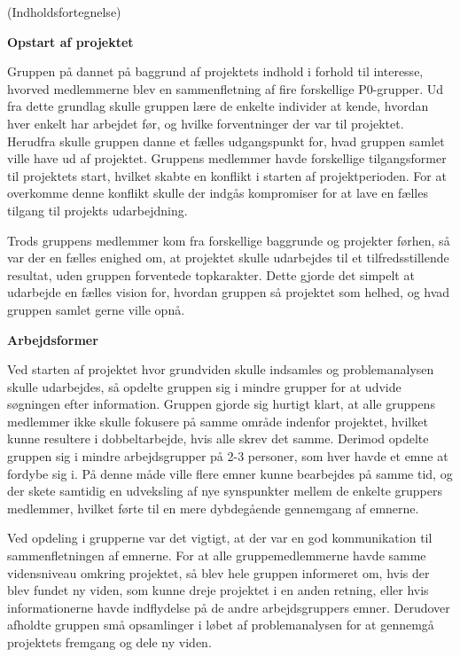 (Indholdsfortegnelse)

\newpage

\textbf{Opstart af projektet}

Gruppen på dannet på baggrund af projektets indhold i forhold til interesse, hvorved medlemmerne blev en sammenfletning af fire forskellige P0-grupper. Ud fra dette grundlag skulle gruppen lære de enkelte individer at kende, hvordan hver enkelt har arbejdet før, og hvilke forventninger der var til projektet. Herudfra skulle gruppen danne et fælles udgangspunkt for, hvad gruppen samlet ville have ud af projektet. Gruppens medlemmer havde forskellige tilgangsformer til projektets start, hvilket skabte en konflikt i starten af projektperioden. For at overkomme denne konflikt skulle der indgås kompromiser for at lave en fælles tilgang til projekts udarbejdning.

Trods gruppens medlemmer kom fra forskellige baggrunde og projekter førhen, så var der en fælles enighed om, at projektet skulle udarbejdes til et tilfredsstillende resultat, uden gruppen forventede topkarakter. Dette gjorde det simpelt at udarbejde en fælles vision for, hvordan gruppen så projektet som helhed, og hvad gruppen samlet gerne ville opnå.

\textbf{Arbejdsformer}

Ved starten af projektet hvor grundviden skulle indsamles og problemanalysen skulle udarbejdes, så opdelte gruppen sig i mindre grupper for at udvide søgningen efter information. Gruppen gjorde sig hurtigt klart, at alle gruppens medlemmer ikke skulle fokusere på samme område indenfor projektet, hvilket kunne resultere i dobbeltarbejde, hvis alle skrev det samme. Derimod opdelte gruppen sig i mindre arbejdsgrupper på 2-3 personer, som hver havde et emne at fordybe sig i. På denne måde ville flere emner kunne bearbejdes på samme tid, og der skete samtidig en udveksling af nye synspunkter mellem de enkelte gruppers medlemmer, hvilket førte til en mere dybdegående gennemgang af emnerne. 

Ved opdeling i grupperne var det vigtigt, at der var en god kommunikation til sammenfletningen af emnerne. For at alle gruppemedlemmerne havde samme vidensniveau omkring projektet, så blev hele gruppen informeret om, hvis der blev fundet ny viden, som kunne dreje projektet i en anden retning, eller hvis informationerne havde indflydelse på de andre arbejdsgruppers emner. Derudover afholdte gruppen små opsamlinger i løbet af problemanalysen for at gennemgå projektets fremgang og dele ny viden.

